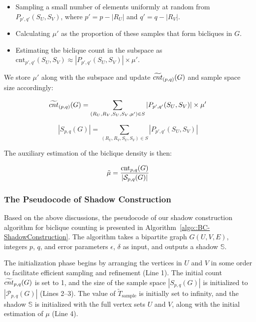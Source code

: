 \begin{itemize}
	\item Sampling a small number of elements uniformly at random from $ P_{p', q'}(S_U, S_V) $, where $ p' = p - |R_U| $ and $ q' = q - |R_V| $.
	\item Calculating $ \mu' $ as the proportion of these samples that form bicliques in $ G $.
	\item Estimating the biclique count in the subspace as $ \text{cnt}_{p',q'}(S_U, S_V) \approx |P_{p', q'}(S_U, S_V)| \times \mu' $.
\end{itemize}

We store $ \mu' $ along with the subspace and update $\widetilde{cnt}_{(p,q)}(G)$ and sample space size accordingly:

\[
\widetilde{cnt}_{(p,q)}(G) = \sum_{(R_U, R_V, S_U, S_V, \mu') \in S} |P_{p', q'}(S_U, S_V)| \times \mu'
\]

\[
|S_{p,q}(G)| = \sum_{(R_U, R_V, S_U, S_V) \in S} |P_{p', q'}(S_U, S_V)|
\]

The auxiliary estimation of the biclique density is then:

\[
\tilde{\mu} = \frac{\text{cnt}_{p,q}(G)}{|\mathcal{S}_{p,q}(G)|}
\]

\subsubsection{The Pseudocode of Shadow Construction}

Based on the above discussions, the pseudocode of our shadow construction algorithm for biclique counting is presented in Algorithm~\ref{algo::BC-ShadowConstruction}. The algorithm takes a bipartite graph $G(U, V, E)$, integers $p$, $q$, and error parameters $\epsilon$, $\delta$ as input, and outputs a shadow $\mathbb{S}$.

The initialization phase begins by arranging the vertices in $U$ and $V$ in some order to facilitate efficient sampling and refinement (Line 1). The initial count $\widetilde{cnt}_{p,q}(G)$ is set to 1, and the size of the sample space $|S_{p,q}(G)|$ is initialized to $|\mathcal{P}_{p,q}(G)|$ (Lines 2–3). The value of $\tilde{T}_{\text{sample}}$ is initially set to infinity, and the shadow $\mathbb{S}$ is initialized with the full vertex sets $U$ and $V$, along with the initial estimation of $\mu$ (Line 4).

